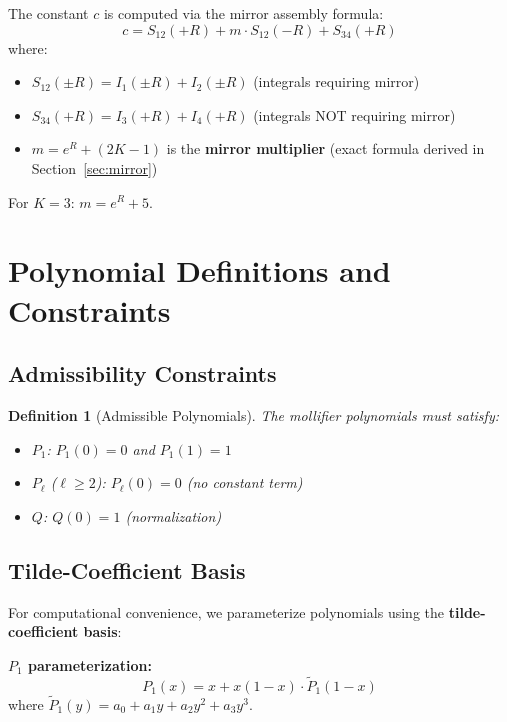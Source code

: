 \documentclass[11pt]{article}
\newtheorem{definition}{Definition}
\begin{document}
The constant $c$ is computed via the mirror assembly formula:
\begin{equation}
\boxed{c = S_{12}(+R) + m \cdot S_{12}(-R) + S_{34}(+R)}
\end{equation}
where:
\begin{itemize}
\item $S_{12}(\pm R) = I_1(\pm R) + I_2(\pm R)$ (integrals requiring mirror)
\item $S_{34}(+R) = I_3(+R) + I_4(+R)$ (integrals NOT requiring mirror)
\item $m = e^R + (2K-1)$ is the \textbf{mirror multiplier} (exact formula derived in Section~\ref{sec:mirror})
\end{itemize}

For $K=3$: $m = e^R + 5$.

\section{Polynomial Definitions and Constraints}
\label{sec:polynomials}

\subsection{Admissibility Constraints}

\begin{definition}[Admissible Polynomials]
The mollifier polynomials must satisfy:
\begin{itemize}
\item $P_1$: $P_1(0) = 0$ and $P_1(1) = 1$
\item $P_\ell$ ($\ell \geq 2$): $P_\ell(0) = 0$ (no constant term)
\item $Q$: $Q(0) = 1$ (normalization)
\end{itemize}
\end{definition}

\subsection{Tilde-Coefficient Basis}

For computational convenience, we parameterize polynomials using the \textbf{tilde-coefficient basis}:

\textbf{$P_1$ parameterization:}
\begin{equation}
P_1(x) = x + x(1-x) \cdot \tilde{P}_1(1-x)
\end{equation}
where $\tilde{P}_1(y) = a_0 + a_1 y + a_2 y^2 + a_3 y^3$.
\end{document}
